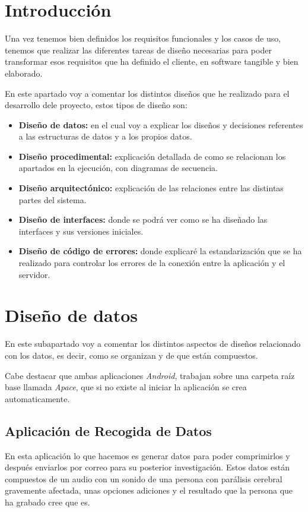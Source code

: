 
\section{Introducción}
Una vez tenemos bien definidos los requisitos funcionales y los casos de uso, tenemos que realizar las diferentes tareas de diseño necesarias para poder transformar esos requisitos que ha definido el cliente, en software tangible y bien elaborado.

En este apartado voy a comentar los distintos diseños que he realizado para el desarrollo dele proyecto, estos tipos de diseño son:
\begin{itemize}
	\item \textbf{Diseño de datos:} en el cual voy a explicar los diseños y decisiones referentes a las estructuras de datos y a los propios datos.
	\item \textbf{Diseño procedimental:} explicación detallada de como se relacionan los apartados en la ejecución, con diagramas de secuencia.
	\item \textbf{Diseño arquitectónico:} explicación de las relaciones entre las distintas partes del sistema.
	\item \textbf{Diseño de interfaces:} donde se podrá ver como se ha diseñado las interfaces y sus versiones iniciales.
	\item \textbf{Diseño de código de errores:} donde explicaré la estandarización que se ha realizado para controlar los errores de la conexión entre la aplicación y el servidor.
\end{itemize}
\section{Diseño de datos}
En este subapartado voy a comentar los distintos aspectos de diseños relacionado con los datos, es decir, como se organizan y de que están compuestos.

Cabe destacar que ambas aplicaciones \textit{Android}, trabajan sobre una carpeta raíz base llamada \textit{Apace}, que si no existe al iniciar la aplicación se crea automaticamente.

\subsection{Aplicación de Recogida de Datos}
En esta aplicación lo que hacemos es generar datos para poder comprimirlos y después enviarlos por correo para su posterior investigación. Estos datos están compuestos de un audio con un sonido de una persona con parálisis cerebral gravemente afectada, unas opciones adiciones y el resultado que la persona que ha grabado cree que es.

